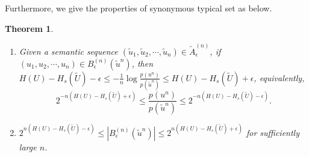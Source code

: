 \documentclass[12pt, draftclsnofoot,onecolumn]{IEEEtran}
\newtheorem{theorem}{\bf{Theorem}}
\begin{document}
Furthermore, we give the properties of synonymous typical set as below.
\begin{theorem}\label{SynTSet_Theorem}
\text{ }
\begin{enumerate}[(1)]
    \item Given a semantic sequence $\left(\tilde{u}_1,\tilde{u}_2,\cdots,\tilde{u}_n\right)\in \tilde{A}_{\epsilon}^{(n)}$, if $\left(u_1, u_2,\cdots,u_n\right)\in B_{\epsilon}^{(n)}\left(\tilde{u}^n\right)$, then $H(U)-H_s(\tilde{U})-\epsilon \leq -\frac{1}{n}\log \frac{p\left(u^n\right)}{p\left(\tilde{u}^n\right)} \leq H(U)-H_s(\tilde{U})+\epsilon$, equivalently,
        \begin{equation}
        2^{-n\left(H(U)-H_s(\tilde{U})+\epsilon\right)}\leq \frac{p\left(u^n\right)}{p\left(\tilde{u}^n\right)} \leq 2^{-n\left(H(U)-H_s(\tilde{U})-\epsilon\right)}.
        \end{equation}
    \item $ 2^{n\left(H(U)-H_s(\tilde{U})-\epsilon\right)}\leq\left|B_{\epsilon}^{(n)}\left(\tilde{u}^n\right)\right| \leq 2^{n\left(H(U)-H_s(\tilde{U})+\epsilon\right)}$ for sufficiently large $n$.
\end{enumerate}
\end{theorem}
\end{document}
